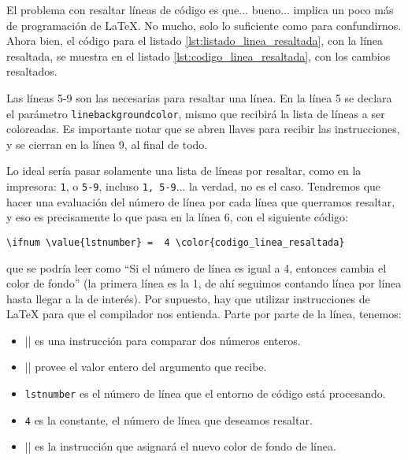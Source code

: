 El problema con resaltar líneas de código es que... bueno... implica un poco más de programación de \LaTeX{}. No mucho, solo lo suficiente como para confundirnos. Ahora bien, el código para el listado \ref{lst:listado_linea_resaltada}, con la línea resaltada, se muestra en el listado \ref{lst:codigo_linea_resaltada}, con los cambios resaltados.

Las líneas 5-9 son las necesarias para resaltar una línea. En la línea 5 se declara el parámetro \texttt{linebackgroundcolor}, mismo que recibirá la lista de líneas a ser coloreadas. Es importante notar que se abren llaves para recibir las instrucciones, y se cierran en la línea 9, al final de todo.



Lo ideal sería pasar solamente una lista de líneas por resaltar, como en la impresora: \texttt{1}, o \texttt{5-9}, incluso \texttt{1, 5-9}... la verdad, no es el caso. Tendremos que hacer una evaluación del número de línea por cada línea que querramos resaltar, y eso es precisamente lo que pasa en la línea 6, con el siguiente código:

\begin{lstlisting}[style=latex]
\ifnum \value{lstnumber} =  4 \color{codigo_linea_resaltada}
\end{lstlisting}

\noindent que se podría leer como ``Si el número de línea es igual a 4, entonces cambia el color de fondo'' (la primera línea es la 1, de ahí seguimos contando línea por línea hasta llegar a la de interés). Por supuesto, hay que utilizar instrucciones de \LaTeX{} para que el compilador nos entienda. Parte por parte de la línea, tenemos:
\begin{itemize}
	\item |\ifnum| es una instrucción para comparar dos números enteros.
	\item |\value| provee el valor entero del argumento que recibe.
	\item \texttt{lstnumber} es el número de línea que el entorno de código está procesando.
	\item \texttt{4} es la constante, el número de línea que deseamos resaltar.
	\item |\color| es la instrucción que asignará el nuevo color de fondo de línea.
\end{itemize}

